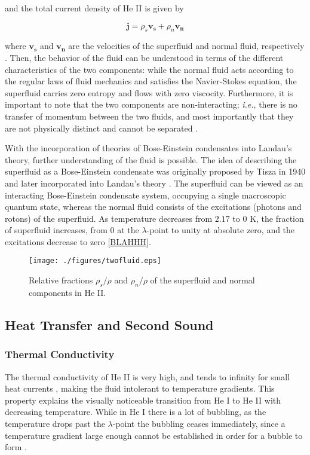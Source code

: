 and the total current density of He II is given by

\begin{equation}
\mathbf{j} = \rho_s\mathbf{v_s} + \rho_n\mathbf{v_n}
\end{equation}

where $\mathbf{v_s}$ and $\mathbf{v_n}$ are the velocities of the
superfluid and normal fluid, respectively \cite{tilley}. Then, the
behavior of the fluid can be understood in terms of the different
characteristics of the two components: while the normal fluid acts
according to the regular laws of fluid mechanics and satisfies the
Navier-Stokes equation, the superfluid carries zero entropy and flows
with zero viscocity. Furthermore, it is important to note that the two
components are non-interacting; \emph{i.e.}, there is no transfer of
momentum between the two fluids, and most importantly that they are
not physically distinct and cannot be separated \cite{tilley}.

With the incorporation of theories of Bose-Einstein condensates into
Landau's theory, further understanding of the fluid is possible. The
idea of describing the superfluid as a Bose-Einstein condensate was
originally proposed by Tisza in 1940 and later incorporated into
Landau's theory \cite{tisza}. The superfluid can be viewed as an
interacting Bose-Einstein condensate system, occupying a single
macroscopic quantum state, whereas the normal fluid consists of the
excitations (photons and rotons) of the superfluid. As temperature
decreases from $2.17$ to $0$ K, the fraction of superfluid increases,
from $0$ at the $\lambda$-point to unity at absolute zero, and the
excitations decrease to zero \ref{BLAHHH}.


\begin{figure}[ht]
\begin{center}
\texttt{[image: ./figures/twofluid.eps]}
\caption{\small{Relative fractions $\rho_s/\rho$ and $\rho_n/\rho$ of
   the superfluid and normal components in He II.}}
\label{figure:twofluid}
\end{center}
\end{figure}



\subsection{Heat Transfer and Second Sound}

\subsubsection{Thermal Conductivity}
The thermal conductivity of He II is very high, and tends to infinity
for small heat currents \cite{tilley}, making the fluid intolerant
to temperature gradients. This property explains the visually
noticeable transition from He I to He II with decreasing temperature.
While in He I there is a lot of bubbling, as the temperature drops
past the $\lambda$-point the bubbling ceases immediately, since a
temperature gradient large enough cannot be established in order for a
bubble to form \cite{tilley}.


